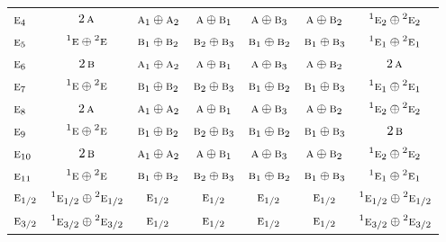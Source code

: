 \documentclass[10pt,a4paper]{article}
\numberwithin{equation}{section}
\newcommand{\irr}[1]{\text{\normalfont\scshape #1}}
\newcommand{\conjpair}[1]{{}^{#1}}
\begin{document}
{\begin{longtable}{@{}lcccccc@{}}
$\irr{e}_{4}$ & $2\,\irr{a}$ & $\irr{a}_{1}\oplus \irr{a}_{2}$ & $\irr{a}\oplus \irr{b}_{1}$ & $\irr{a}\oplus \irr{b}_{3}$ & $\irr{a}\oplus \irr{b}_{2}$ & $\conjpair{1}\irr{e}_{2}\oplus \conjpair{2}\irr{e}_{2}$\\
$\irr{e}_{5}$ & $\conjpair{1}\irr{e}\oplus \conjpair{2}\irr{e}$ & $\irr{b}_{1}\oplus \irr{b}_{2}$ & $\irr{b}_{2}\oplus \irr{b}_{3}$ & $\irr{b}_{1}\oplus \irr{b}_{2}$ & $\irr{b}_{1}\oplus \irr{b}_{3}$ & $\conjpair{1}\irr{e}_{1}\oplus \conjpair{2}\irr{e}_{1}$\\
$\irr{e}_{6}$ & $2\,\irr{b}$ & $\irr{a}_{1}\oplus \irr{a}_{2}$ & $\irr{a}\oplus \irr{b}_{1}$ & $\irr{a}\oplus \irr{b}_{3}$ & $\irr{a}\oplus \irr{b}_{2}$ & $2\,\irr{a}$\\
$\irr{e}_{7}$ & $\conjpair{1}\irr{e}\oplus \conjpair{2}\irr{e}$ & $\irr{b}_{1}\oplus \irr{b}_{2}$ & $\irr{b}_{2}\oplus \irr{b}_{3}$ & $\irr{b}_{1}\oplus \irr{b}_{2}$ & $\irr{b}_{1}\oplus \irr{b}_{3}$ & $\conjpair{1}\irr{e}_{1}\oplus \conjpair{2}\irr{e}_{1}$\\
$\irr{e}_{8}$ & $2\,\irr{a}$ & $\irr{a}_{1}\oplus \irr{a}_{2}$ & $\irr{a}\oplus \irr{b}_{1}$ & $\irr{a}\oplus \irr{b}_{3}$ & $\irr{a}\oplus \irr{b}_{2}$ & $\conjpair{1}\irr{e}_{2}\oplus \conjpair{2}\irr{e}_{2}$\\
$\irr{e}_{9}$ & $\conjpair{1}\irr{e}\oplus \conjpair{2}\irr{e}$ & $\irr{b}_{1}\oplus \irr{b}_{2}$ & $\irr{b}_{2}\oplus \irr{b}_{3}$ & $\irr{b}_{1}\oplus \irr{b}_{2}$ & $\irr{b}_{1}\oplus \irr{b}_{3}$ & $2\,\irr{b}$\\
$\irr{e}_{10}$ & $2\,\irr{b}$ & $\irr{a}_{1}\oplus \irr{a}_{2}$ & $\irr{a}\oplus \irr{b}_{1}$ & $\irr{a}\oplus \irr{b}_{3}$ & $\irr{a}\oplus \irr{b}_{2}$ & $\conjpair{1}\irr{e}_{2}\oplus \conjpair{2}\irr{e}_{2}$\\
$\irr{e}_{11}$ & $\conjpair{1}\irr{e}\oplus \conjpair{2}\irr{e}$ & $\irr{b}_{1}\oplus \irr{b}_{2}$ & $\irr{b}_{2}\oplus \irr{b}_{3}$ & $\irr{b}_{1}\oplus \irr{b}_{2}$ & $\irr{b}_{1}\oplus \irr{b}_{3}$ & $\conjpair{1}\irr{e}_{1}\oplus \conjpair{2}\irr{e}_{1}$\\
$\irr{e}_{1/2}$ & $\conjpair{1}\irr{e}_{1/2}\oplus \conjpair{2}\irr{e}_{1/2}$ & $\irr{e}_{1/2}$ & $\irr{e}_{1/2}$ & $\irr{e}_{1/2}$ & $\irr{e}_{1/2}$ & $\conjpair{1}\irr{e}_{1/2}\oplus \conjpair{2}\irr{e}_{1/2}$\\
$\irr{e}_{3/2}$ & $\conjpair{1}\irr{e}_{3/2}\oplus \conjpair{2}\irr{e}_{3/2}$ & $\irr{e}_{1/2}$ & $\irr{e}_{1/2}$ & $\irr{e}_{1/2}$ & $\irr{e}_{1/2}$ & $\conjpair{1}\irr{e}_{3/2}\oplus \conjpair{2}\irr{e}_{3/2}$\\

\end{longtable}}
\end{document}
